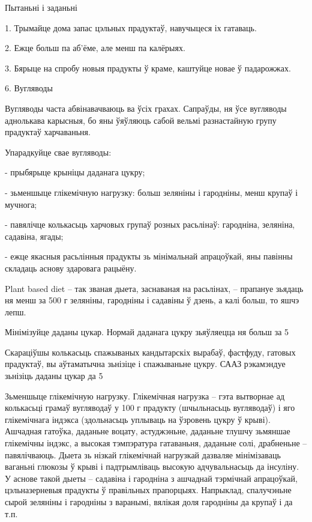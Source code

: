 Пытаньні і заданьні

1. Трымайце дома запас цэльных прадуктаў, навучыцеся іх гатаваць.

2. Ежце больш па аб'ёме, але менш па калёрыях.

3. Бярыце на спробу новыя прадукты ў краме, каштуйце новае ў падарожжах.


6. Вугляводы

Вугляводы часта абвінавачваюць ва ўсіх грахах. Сапраўды, ня ўсе вугляводы аднолькава карысныя, бо яны ўяўляюць сабой вельмі разнастайную групу прадуктаў харчаваньня.

Упарадкуйце свае вугляводы:

- прыбярыце крыніцы даданага цукру;

- зьменшыце глікемічную нагрузку: больш зеляніны і гародніны, менш крупаў і мучнога;

- павялічце колькасьць харчовых групаў розных расьлінаў: гародніна, зеляніна, садавіна, ягады;

- ежце якасныя расьлінныя прадукты зь мінімальнай апрацоўкай, яны павінны складаць аснову здаровага рацыёну.

Plant based diet – так званая дыета, заснаваная на расьлінах, – прапануе зьядаць ня менш за 500 г зеляніны, гародніны і садавіны ў дзень, а калі больш, то яшчэ лепш.

Мінімізуйце даданы цукар. Нормай даданага цукру зьяўляецца ня больш за 5%

Скараціўшы колькасьць спажываных кандытарскіх вырабаў, фастфуду, гатовых прадуктаў, вы аўтаматычна зьнізіце і спажываньне цукру. СААЗ рэкамэндуе зьнізіць даданы цукар да 5%

Зьменшыце глікемічную нагрузку. Глікемічная нагрузка – гэта вытворнае ад колькасьці грамаў вугляводаў у 100 г прадукту (шчыльнасьць вугляводаў) і яго глікемічнага індэкса (здольнасьць уплываць на ўзровень цукру ў крыві). Ашчадная гатоўка, даданьне воцату, астуджэньне, даданьне тлушчу зьмяншае глікемічны індэкс, а высокая тэмпэратура гатаваньня, даданьне солі, драбненьне – павялічваюць. Дыета зь нізкай глікемічнай нагрузкай дазваляе мінімізаваць ваганьні глюкозы ў крыві і падтрымліваць высокую адчувальнасьць да інсуліну. У аснове такой дыеты – садавіна і гародніна з ашчаднай тэрмічнай апрацоўкай, цэльназерневыя прадукты ў правільных прапорцыях. Напрыклад, спалучэньне сырой зеляніны і гародніны з варанымі, вялікая доля гародніны да крупаў і да т.п.

